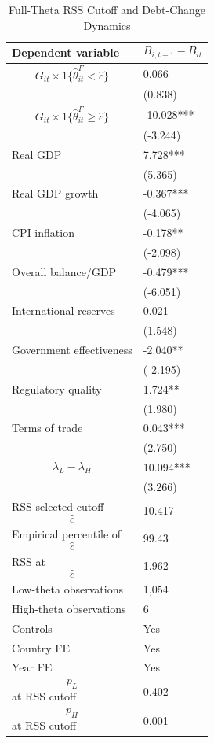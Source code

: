 \begin{table}[H]\centering
\begin{threeparttable}
\caption{Full-Theta RSS Cutoff and Debt-Change Dynamics}
\label{tab:deltaB_rss_cutoff_fulltheta}
\scriptsize
\begin{tabularx}{\textwidth}{lY}
\toprule
Dependent variable & $$B_{i,t+1}-B_{it}$$ \\
\midrule
$$G_{it}\times 1\{\widehat{\theta}^{F}_{it}<\widehat{c}\}$$ & 0.066 \\
 & (0.838) \\
$$G_{it}\times 1\{\widehat{\theta}^{F}_{it}\geq\widehat{c}\}$$ & -10.028*** \\
 & (-3.244) \\
Real GDP & 7.728*** \\
 & (5.365) \\
Real GDP growth & -0.367*** \\
 & (-4.065) \\
CPI inflation & -0.178** \\
 & (-2.098) \\
Overall balance/GDP & -0.479*** \\
 & (-6.051) \\
International reserves & 0.021 \\
 & (1.548) \\
Government effectiveness & -2.040** \\
 & (-2.195) \\
Regulatory quality & 1.724** \\
 & (1.980) \\
Terms of trade & 0.043*** \\
 & (2.750) \\
$$\lambda_L-\lambda_H$$ & 10.094*** \\
 & (3.266) \\
\midrule
RSS-selected cutoff $$\widehat{c}$$ & 10.417 \\
Empirical percentile of $$\widehat{c}$$ & 99.43 \\
RSS at $$\widehat{c}$$ & 1.962 \\
Low-theta observations & 1,054 \\
High-theta observations & 6 \\
Controls & Yes \\
Country FE & Yes \\
Year FE & Yes \\
$$p_L$$ at RSS cutoff & 0.402 \\
$$p_H$$ at RSS cutoff & 0.001 \\

\end{tabularx}
\end{threeparttable}
\end{table}
